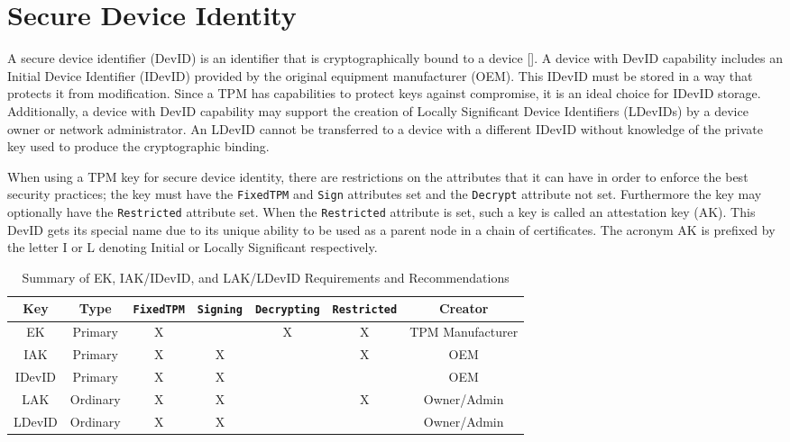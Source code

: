 \chapter{Secure Device Identity}

A secure device identifier (DevID) is an identifier that is cryptographically bound to a device [\cite{DevIDSpec-IEEE}]. A device with DevID capability includes an Initial Device Identifier (IDevID) provided by the original equipment manufacturer (OEM). This IDevID must be stored in a way that protects it from modification. Since a TPM has capabilities to protect keys against compromise, it is an ideal choice for IDevID storage. Additionally, a device with DevID capability may support the creation of Locally Significant Device Identifiers (LDevIDs) by a device owner or network administrator. An LDevID cannot be transferred to a device with a different IDevID without knowledge of the private key used to produce the cryptographic binding.

When using a TPM key for secure device identity, there are restrictions on the attributes that it can have in order to enforce the best security practices; the key must have the \texttt{FixedTPM} and \texttt{Sign} attributes set and the \texttt{Decrypt} attribute not set. Furthermore the key may optionally have the \texttt{Restricted} attribute set. When the \texttt{Restricted} attribute is set, such a key is called an attestation key (AK). This DevID gets its special name due to its unique ability to be used as a parent node in a chain of certificates. The acronym AK is prefixed by the letter I or L denoting Initial or Locally Significant respectively. 



\begin{table}[h]
  \begin{center}
    \scriptsize 
    \sffamily
    \renewcommand{\arraystretch}{1.5}
    \begin{tabular}{ |c|c|c|c|c|c|c| }
      \hline
      Key & Type & \texttt{FixedTPM} & \texttt{Signing} & \texttt{Decrypting} & \texttt{Restricted} & Creator \\
      \hline
      \hline
      EK & Primary       & X &   & X & X & TPM Manufacturer \\
      \hline
      IAK & Primary      & X & X &   & X & OEM \\
      \hline
      IDevID & Primary   & X & X &   &   & OEM \\
      \hline
      LAK & Ordinary     & X & X &   & X & Owner/Admin \\
      \hline
      LDevID & Ordinary  & X & X &   &   & Owner/Admin \\
      \hline
    \end{tabular}
    \caption{Summary of EK, IAK/IDevID, and LAK/LDevID Requirements and Recommendations}
    \label{fig:req_and_recs}
  \end{center}
\end{table}


